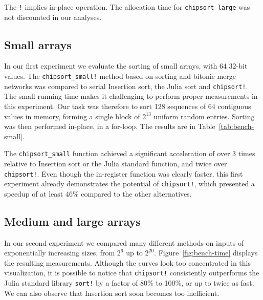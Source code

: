 \documentclass{juliacon}
\begin{document}
The {\tt !} implies in-place operation. The allocation time for {\tt chipsort\_large} was not discounted in our analyses.

\subsection{Small arrays}
In our first experiment we evaluate the sorting of small arrays, with 64 32-bit values. The {\tt chipsort\_small!} method based on sorting and bitonic merge networks was compared to serial Insertion sort, the Julia sort and {\tt chipsort!}. The small running time makes it challenging to perform proper measurements in this experiment. Our task was therefore to sort 128 sequences of 64 contiguous values in memory, forming a single block of $2^{13}$ uniform random entries. Sorting was then performed in-place, in a for-loop. The results are in Table~\ref{tab:bench-small}.

\begin{table}[h]
\label{tab:bench-small}
\end{table}

The {\tt chipsort\_small} function achieved a significant acceleration of over 3 times relative to Insertion sort or the Julia standard function, and twice over {\tt chipsort!}. Even though the in-register function was clearly faster, this first experiment already demonstrates the potential of {\tt chipsort!}, which presented a speedup of at least 46\% compared to the other alternatives.

\subsection{Medium and large arrays}
In our second experiment we compared many different methods on inputs of exponentially increasing sizes, from $2^6$ up to $2^{20}$. Figure~\ref{fig:bench-time} displays the resulting measurements. Although the curves look too concentrated in this visualization, it is possible to notice that {\tt chipsort!} consistently outperforms the Julia standard library {\tt sort!} by a factor of 80\% to 100\%, or up to twice as fast. We can also observe that Insertion sort soon becomes too inefficient.
\end{document}
